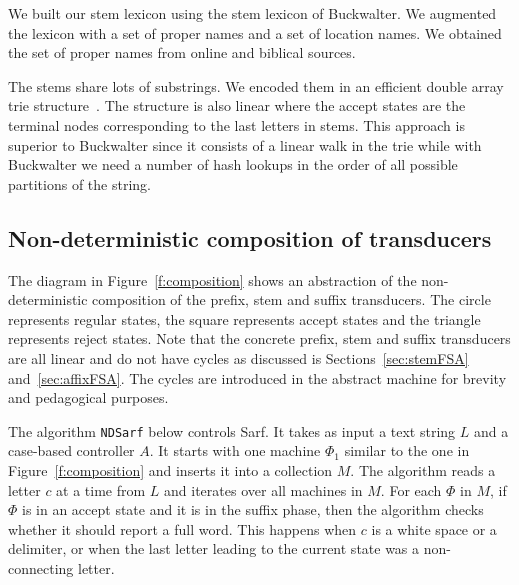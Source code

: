 \documentclass[11pt]{article}
\newcommand{\CodeIn}[1]{{\small\texttt{#1}}}
\begin{document}
We built our stem lexicon using the stem lexicon of 
Buckwalter. 
We augmented the lexicon with a set of proper names and
a set of location names. 
We obtained the set of proper names from online 
and biblical sources. 

The stems share lots of substrings. We encoded them in
an efficient double array trie structure~\cite{Aoe:89}. 
The structure is also linear where the accept
states are the terminal nodes corresponding to the last 
letters in stems. 
This approach is superior to Buckwalter since it consists of
a linear walk in the trie while with Buckwalter we need
a number of hash lookups in the order of all possible partitions
of the string.

\subsection{Non-deterministic composition of transducers}
\label{sec:ndfsa}

The diagram in Figure~\ref{f:composition} shows an 
abstraction of the non-deterministic composition 
of the prefix, stem and suffix transducers. 
The circle represents regular states, the square
represents accept states and the triangle represents
reject states. 
Note that the concrete prefix, stem and suffix transducers
are all linear and do not have cycles as discussed 
is Sections~\ref{sec:stemFSA} and~\ref{sec:affixFSA}.
The cycles are introduced in the abstract machine
for brevity and pedagogical purposes.

\begin{figure*}[tb]
\end{figure*}

The algorithm \CodeIn{NDSarf} below controls Sarf. 
It takes as input a text string $L$ and a case-based controller
$A$. 
It starts with one machine $\Phi_1$ similar to the one in 
Figure~\ref{f:composition} and inserts it into a collection
$M$. 
The algorithm reads a letter $c$ at a time from $L$
and iterates over all machines in $M$. 
For each $\Phi$ in $M$,
if $\Phi$ is in an accept state and it is in the suffix
phase, then the algorithm checks whether it should report
a full word. 
This happens when $c$ is a white space or a delimiter, 
or when the last letter leading to the current state
was a non-connecting letter. 
\end{document}

